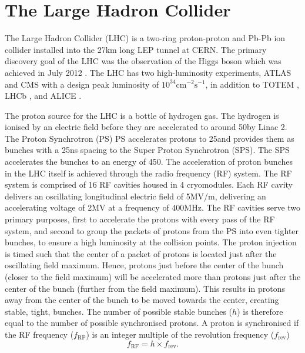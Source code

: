 \section{The Large Hadron Collider}
The Large Hadron Collider \cite{LHC:LHC} (LHC) is a two-ring proton-proton and Pb-Pb ion collider installed into the 27km long LEP tunnel at CERN. The primary discovery goal of the LHC was the observation of the Higgs boson which was achieved in July 2012 \cite{Atlas:higgs}. The LHC has two high-luminosity experiments, ATLAS \cite{Atlas:design} and CMS \cite{LHC:CMS} with a design peak luminosity of $10^{34}\text{cm}^{-2}\text{s}^{-1}$, in addition to TOTEM \cite{LHC:TOTEM}, LHCb \cite{LHC:LHCb}, and ALICE \cite{LHC:ALICE}. 

The proton source for the LHC is a bottle of hydrogen gas. The hydrogen is ionised by an electric field before they are accelerated to around 50\MeV by Linac 2. The Proton Synchrotron (PS) PS accelerates protons to 25\GeV and provides them as bunches with a 25ns spacing to the Super Proton Synchrotron (SPS). The SPS accelerates the bunches to an energy of 450\GeV. The acceleration of proton bunches in the LHC itself is achieved through the radio frequency (RF) system. The RF system is comprised of 16 RF cavities housed in 4 cryomodules. Each RF cavity delivers an oscillating longitudinal electric field of 5MV/m, delivering an accelerating voltage of 2MV at a frequency of 400MHz. The RF cavities serve two primary purposes, first to accelerate the protons with every pass of the RF system, and second to group the packets of  protons from the PS into even tighter bunches, to ensure a high luminosity at the collision points. The proton injection is timed such that the center of a packet of protons is located just after the oscillating field maximum. Hence, protons just before the center of the bunch (closer to the field maximum) will be accelerated more than protons just after the center of the bunch (further from the field maximum). This results in protons away from the center of the bunch to be moved towards the center, creating stable, tight, bunches. The number of possible stable bunches ($h$) is therefore equal to the number of possible synchronised protons. A proton is synchronised if the RF frequency ($f_{\text{RF}}$) is an integer multiple of the revolution frequency ($f_{\text{rev}}$)
\begin{equation}
    f_{\text{RF}}=h\times f_{\text{rev}}.
\end{equation}
